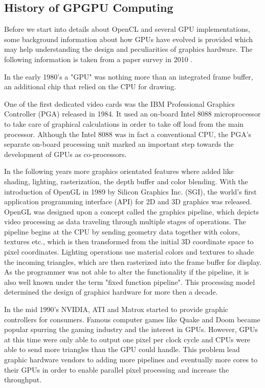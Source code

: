 \subsection{History of GPGPU Computing} 
\label{sec:history}
Before we start into details about OpenCL and several GPU implementations, some background information about how GPUs have evolved is provided which may help understanding the design and peculiarities of graphics hardware. The following information is taken from a paper survey in 2010 \cite{gpu_history}.

In the early 1980's a "GPU" was nothing more than an integrated frame buffer, an additional chip that relied on the CPU for drawing.

One of the first dedicated video cards was the IBM Professional Graphics Controller (PGA) released in 1984. It used an on-board Intel 8088 microprocessor to take care of graphical calculations in order to take off load from the main processor. Although the Intel 8088 was in fact a conventional CPU, the PGA's separate on-board processing unit marked an important step towards the development of GPUs as co-processors.

In the following years more graphics orientated features where added like shading, lighting, rasterization, the depth buffer and color blending. With the introduction of OpenGL in 1989 by Silicon Graphics Inc. (SGI), the world's first application programming interface (API) for 2D and 3D graphics was released. OpenGL was designed upon a concept called the graphics pipeline, which depicts video processing as data traveling through multiple stages of operations. The pipeline begins at the CPU by sending geometry data together with colors, textures etc., which is then transformed from the initial 3D coordinate space to pixel coordinates. Lighting operations use material colors and textures to shade the incoming triangles, which are then rasterized into the frame buffer for display. As the programmer was not able to alter the functionality if the pipeline, it is also well known under the term "fixed function pipeline". This processing model determined the design of graphics hardware for more then a decade.

In the mid 1990's NVIDIA, ATI and Matrox started to provide graphic controllers for consumers. Famous computer games like Quake and Doom became popular spurring the gaming industry and the interest in GPUs. However, GPUs at this time were only able to output one pixel per clock cycle and CPUs were able to send more triangles than the GPU could handle. This problem lead graphic hardware vendors to adding more pipelines and eventually more cores to their GPUs in order to enable parallel pixel processing and increase the throughput.

